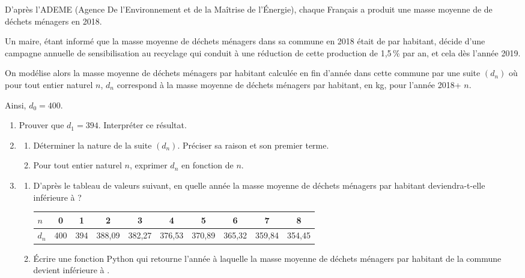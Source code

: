 \medskip

D'après l'ADEME (Agence De l'Environnement et de la Maîtrise de l'Énergie), chaque Français
a produit une masse moyenne de   de déchets ménagers en 2018.

Un maire, étant informé que la masse moyenne de déchets ménagers dans sa commune en
2018 était de   par habitant, décide d'une campagne annuelle de sensibilisation au
recyclage qui conduit à une réduction de cette production de 1,5\,\% par an, et cela dès
l'année 2019.

On modélise alors la masse moyenne de déchets ménagers par habitant calculée en fin
d'année dans cette commune par une suite $(d_n)$ où pour tout entier naturel $n$, $d_n$
correspond à la masse moyenne de déchets ménagers par habitant, en kg, pour l'année
2018+ $n$.

Ainsi, $d_0 = 400$.

\medskip

\begin{enumerate}
\item Prouver que $d_1 = 394$. Interpréter ce résultat.
\item 
	\begin{enumerate}
		\item  Déterminer la nature de la suite $(d_n)$. Préciser sa raison et son premier terme.
		\item Pour tout entier naturel $n$, exprimer $d_n$ en fonction de $n$.
	\end{enumerate}
\item 
	\begin{enumerate}
		\item  D'après le tableau de valeurs suivant, en quelle année la masse moyenne de déchets
ménagers par habitant deviendra-t-elle inférieure à  ?

\smallskip

\begin{tabular}[]{|l|*{9}{c|}}
\hline
$n$& 0& 1& 2& 3& 4& 5& 6 &7& 8\\
\hline
$d_n$& 400& 394& 388,09& 382,27& 376,53& 370,89& 365,32& 359,84& 354,45\\
\hline
\end{tabular}

		\item Écrire une fonction Python qui retourne l'année à laquelle la masse moyenne de déchets
ménagers par habitant de la commune devient inférieure à .
	\end{enumerate}
\end{enumerate}
